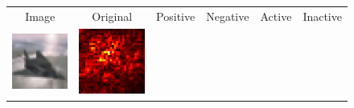 \documentclass[preprint,12pt]{elsarticle}
\begin{document}
\begin{figure}[p]
  \centering
  \footnotesize
  \newcommand{\scale}{0.25}
  \setlength{\tabcolsep}{2pt}
  \begin{tabular}{cccccc}
  Image & Original & Positive & Negative & Active & Inactive \\
  
  \includegraphics[scale=\scale]{../visualizations/examples/cifar10/cnn/images/0.png} &
  \includegraphics[scale=\scale]{../visualizations/examples/cifar10/cnn/saliency_map/0.png} & 

\end{tabular}
\end{figure}
\end{document}

